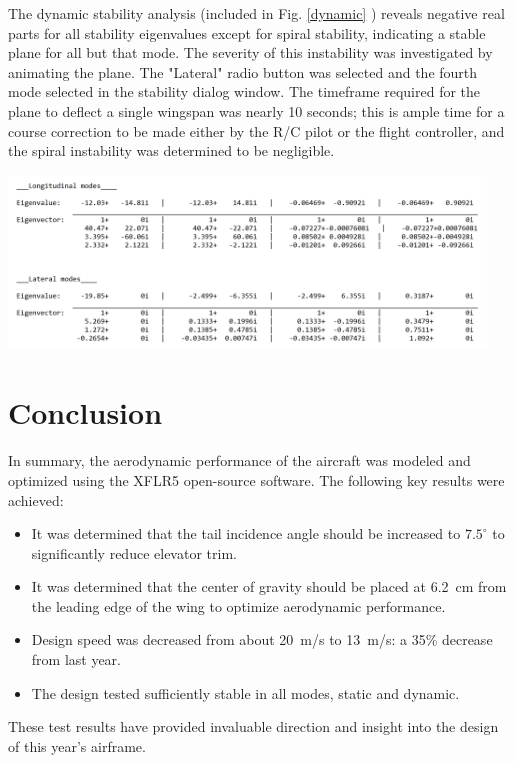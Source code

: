\documentclass[]{auvsi_doc}
\begin{document}
The dynamic stability analysis (included in Fig. \ref{dynamic} ) reveals negative real parts for all stability eigenvalues except for spiral stability, indicating a stable plane for all but that mode. The severity of this instability was investigated by animating the plane. The "Lateral" radio button was selected and the fourth mode selected in the stability dialog window. The timeframe required for the plane to deflect a single wingspan was nearly 10 seconds; this is ample time for a course correction to be made either by the R/C pilot or the flight controller, and the spiral instability was determined to be negligible.

\begin{center}
	\includegraphics[width=0.95\textwidth]{./figs/dynamicStability.png}
	\label{dynamic}
\end{center}

\section{Conclusion}

In summary, the aerodynamic performance of the aircraft was modeled and optimized using the XFLR5 open-source software. The following key results were achieved:

\begin{itemize}
	\item It was determined that the tail incidence angle should be increased to $7.5^\circ$ to significantly reduce elevator trim.
	\item It was determined that the center of gravity should be placed at 6.2~cm from the leading edge of the wing to optimize aerodynamic performance.
	\item Design speed was decreased from about 20~m/s to 13~m/s: a 35\% decrease from last year.
	\item The design tested sufficiently stable in all modes, static and dynamic.
\end{itemize}

These test results have provided invaluable direction and insight into the design of this year's airframe.
\end{document}

